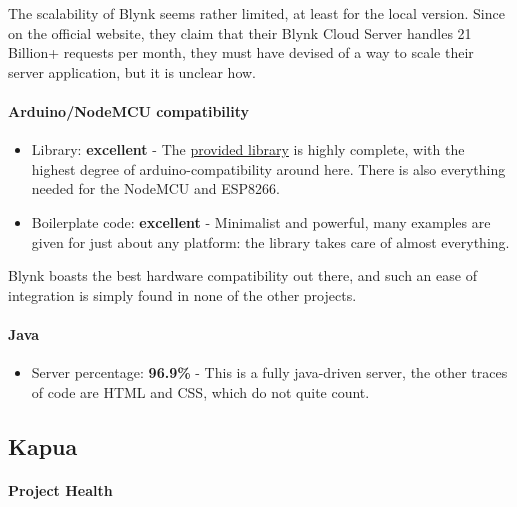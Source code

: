 \documentclass{article}
\begin{document}
The scalability of Blynk seems rather limited, at least for the local version. Since on the official website, they claim that their Blynk Cloud Server handles 21 Billion+ requests per month, they must have devised of a way to scale their server application, but it is unclear how.

\paragraph{Arduino/NodeMCU compatibility}

\begin{itemize}
\item Library: \textbf{excellent} - The \href{https://github.com/blynkkk/blynk-library}{provided library} is highly complete, with the highest degree of arduino-compatibility around here. There is also everything needed for the NodeMCU and ESP8266.
\item Boilerplate code: \textbf{excellent} - Minimalist and powerful, many examples are given for just about any platform: the library takes care of almost everything.
\end{itemize}

Blynk boasts the best hardware compatibility out there, and such an ease of integration is simply found in none of the other projects.

\paragraph{Java} 

\begin{itemize}
\item Server percentage: \textbf{96.9\%} - This is a fully java-driven server, the other traces of code are HTML and CSS, which do not quite count.
\end{itemize}

\subsection{Kapua}

\paragraph{Project Health}
\end{document}
